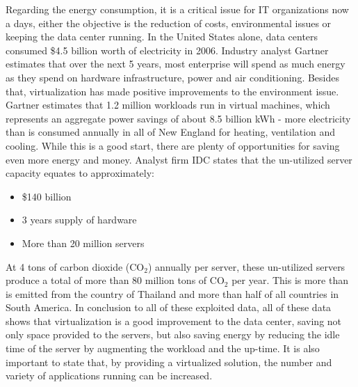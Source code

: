                 Regarding the energy consumption, it is a critical issue for IT organizations now a days, either the objective is the reduction of costs, environmental issues or keeping the data center running. In the United States alone, data centers consumed \$4.5 billion worth of electricity in 2006. Industry analyst Gartner \cite{GartnetKumar07} estimates that over the next 5 years, most enterprise will spend as much energy as they spend on hardware infrastructure, power and air conditioning. Besides that, virtualization has made positive improvements to the environment issue. Gartner \cite{GartnetStamford07} estimates that 1.2 million workloads run in virtual machines, which represents an aggregate power savings of about 8.5 billion kWh - more electricity than is consumed annually in all of New England for heating, ventilation and cooling. While this is a good start, there are plenty of opportunities for saving even more energy and money. Analyst firm IDC \cite{IDCDoc07} states that the un-utilized server capacity equates to approximately:
                \begin{itemize}
                    \item \$140 billion
                    \item 3 years supply of hardware
                    \item More than 20 million servers 
                \end{itemize}
                At 4 tons of carbon dioxide (CO$_{2}$) annually per server, these un-utilized servers produce a total of more than 80 million tons of CO$_{2}$ per year. This is more than is emitted from the country of Thailand and more than half of all countries in South America. In conclusion to all of these exploited data, all of these data shows that virtualization is a good improvement to the data center, saving not only space provided to the servers, but also saving energy by reducing the idle time of the server by augmenting the workload and the up-time. It is also important to state that, by providing a virtualized solution, the number and variety of applications running can be increased.

